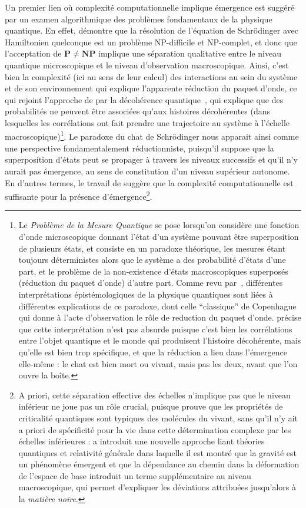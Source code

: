 {}{
Un premier lien où complexité computationnelle implique émergence est suggéré par un examen algorithmique des problèmes fondamentaux de la physique quantique. En effet, \cite{2014arXiv1403.7686B} démontre que la résolution de l'équation de Schrödinger avec Hamiltonien quelconque est un problème NP-difficile et NP-complet, et donc que l'acceptation de $\mathbf{P}\neq\mathbf{NP}$ implique une séparation qualitative entre le niveau quantique microscopique et le niveau d'observation macroscopique. Ainsi, c'est bien la complexité (ici au sens de leur calcul) des interactions au sein du système et de son environnement qui explique l'apparente réduction du paquet d'onde, ce qui rejoint l'approche de  par la décohérence quantique~\cite{gell1996quantum}, qui explique que des probabilités ne peuvent être associées qu'aux histoires décohérentes (dans lesquelles les corrélations ont fait prendre une trajectoire au système à l'échelle macroscopique)\footnote{Le \emph{Problème de la Mesure Quantique} se pose lorsqu'on considère une fonction d'onde microscopique donnant l'état d'un système pouvant être superposition de plusieurs états, et consiste en un paradoxe théorique, les mesures étant toujours déterministes alors que le système a des probabilité d'états d'une part, et le problème de la non-existence d'états macroscopiques superposés (réduction du paquet d'onde) d'autre part. Comme revu par~\cite{schlosshauer2005decoherence}, différentes interprétations épistémologiques de la physique quantiques sont liées à différentes explications de ce paradoxe, dont celle ``classique'' de Copenhague qui donne à l'acte d'observation le rôle de reduction du paquet d'onde.  précise que cette interprétation n'est pas absurde puisque c'est bien les corrélations entre l'objet quantique et le monde qui produisent l'histoire décohérente, mais qu'elle est bien trop spécifique, et que la réduction a lieu dans l'émergence elle-même : le chat est bien mort ou vivant, mais pas les deux, avant que l'on ouvre la boîte.}. Le paradoxe du chat de Schrödinger nous apparait ainsi comme une perspective fondamentalement réductionniste, puisqu'il suppose que la superposition d'états peut se propager à travers les niveaux successifs et qu'il n'y aurait pas émergence, au sens de constitution d'un niveau supérieur autonome. En d'autres termes, le travail de \cite{2014arXiv1403.7686B} suggère que la complexité computationnelle est suffisante pour la présence d'émergence\footnote{A priori, cette séparation effective des échelles n'implique pas que le niveau inférieur ne joue pas un rôle crucial, puisque \cite{vattay2015quantum} prouve que les propriétés de criticalité quantiques sont typiques des molécules du vivant, sans qu'il n'y ait a priori de spécificité pour la vie dans cette détermination complexe par les échelles inférieures : \cite{2016arXiv161102269V} a introduit une nouvelle approche liant théories quantiques et relativité générale dans laquelle il est montré que la gravité est un phénomène émergent et que la dépendance au chemin dans la déformation de l'espace de base introduit un terme supplémentaire au niveau macroscopique, qui permet d'expliquer les déviations attribuées jusqu'alors à la \emph{matière noire}.}.
}


